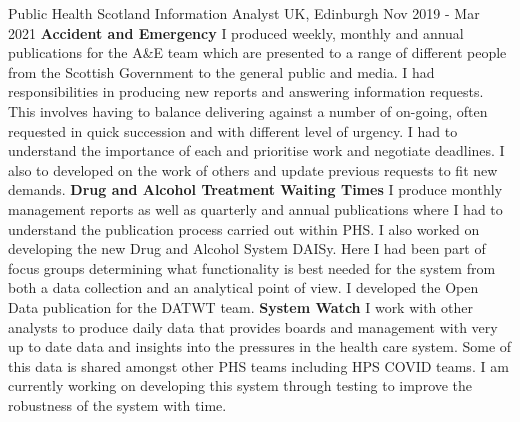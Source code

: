  \cventry
    {Public Health Scotland} %
    {Information Analyst} %
    {UK, Edinburgh} %
    {Nov 2019 - Mar 2021} %
    {
        \textbf{Accident and Emergency}\newline
        I produced weekly, monthly and annual publications for the A\&E team which are presented to a range of different people from the Scottish Government to the general public and media. I had responsibilities in producing new reports and answering information requests. This involves having to balance delivering against a number of on-going, often requested in quick succession and with different level of urgency. I had to understand the importance of each and prioritise work and negotiate deadlines. I also to developed on the work of others and update previous requests to fit new demands.\newline
        \textbf{Drug and Alcohol Treatment Waiting Times}\newline
        I produce monthly management reports as well as quarterly and annual publications where I had to understand the publication process carried out within PHS. I also worked on developing the new Drug and Alcohol System DAISy. Here I had been part of focus groups determining what functionality is best needed for the system from both a data collection and an analytical point of view. I developed the Open Data publication for the DATWT team.\newline
        \textbf{System Watch}\newline
        I work with other analysts to produce daily data that provides boards and management with very up to date data and insights into the pressures in the health care system. Some of this data is shared amongst other PHS teams including HPS COVID teams. I am currently working on developing this system through testing to improve the robustness of the system with time.\newline
}